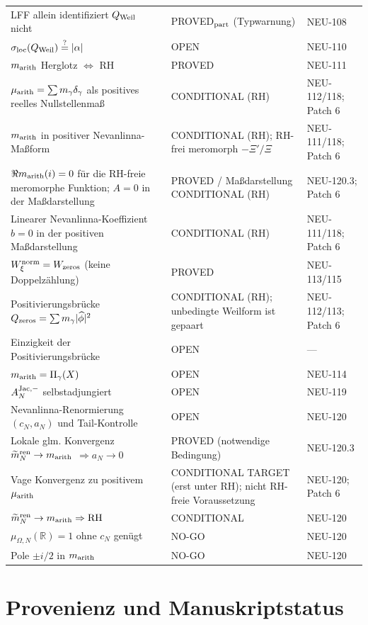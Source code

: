 \documentclass[11pt,a4paper]{amsart}
\newcommand{\RH}{\mathrm{RH}}
\begin{document}
\begin{longtable}{>{\raggedright\arraybackslash}p{}
                  >{\raggedright\arraybackslash}p{}
                  >{\raggedright\arraybackslash}p{}}
LFF allein identifiziert $Q_{\rm Weil}$ nicht
& PROVED$_{\rm part}$ (Typwarnung) & NEU-108\\
$\sigma_{\rm loc}(Q_{\rm Weil})\stackrel?=|\alpha|$
& OPEN & NEU-110\\
$m_{\rm arith}$ Herglotz $\Leftrightarrow$ RH
& PROVED & NEU-111\\
$\mu_{\rm arith}=\sum m_\gamma\delta_\gamma$ als positives reelles Nullstellenmaß
& CONDITIONAL (RH) & NEU-112/118; Patch 6\\
$m_{\rm arith}$ in positiver Nevanlinna-Maßform
& CONDITIONAL (RH); RH-frei meromorph $-\Xi'/\Xi$ & NEU-111/118; Patch 6\\
$\Re m_{\rm arith}(i)=0$ für die RH-freie meromorphe Funktion; $A=0$ in der Maßdarstellung
& PROVED / Maßdarstellung CONDITIONAL (RH) & NEU-120.3; Patch 6\\
Linearer Nevanlinna-Koeffizient $b=0$ in der positiven Maßdarstellung
& CONDITIONAL (RH) & NEU-111/118; Patch 6\\
$W_\xi^{\rm norm}=W_{\rm zeros}$ (keine Doppelzählung)
& PROVED & NEU-113/115\\
Positivierungsbrücke
$Q_{\rm zeros}=\sum m_\gamma|\widehat\phi|^2$
& CONDITIONAL (RH); unbedingte Weilform ist gepaart & NEU-112/113; Patch 6\\
Einzigkeit der Positivierungsbrücke
& OPEN & ---\\
$m_{\rm arith}=\Pi_\gamma(X)$
& OPEN & NEU-114\\
$A_N^{\rm Jac,-}$ selbstadjungiert
& OPEN & NEU-119\\
Nevanlinna-Renormierung $(c_N,a_N)$ und Tail-Kontrolle
& OPEN & NEU-120\\
Lokale glm. Konvergenz $\widetilde m_N^{\rm ren}\to m_{\rm arith}$
$\Rightarrow a_N\to0$
& PROVED (notwendige Bedingung) & NEU-120.3\\
Vage Konvergenz zu positivem $\mu_{\rm arith}$
& CONDITIONAL TARGET (erst unter RH); nicht RH-freie Voraussetzung & NEU-120; Patch 6\\
$\widetilde m_N^{\rm ren}\to m_{\rm arith}\Rightarrow\RH$
& CONDITIONAL & NEU-120\\
$\mu_{\Omega,N}(\mathbb R)=1$ ohne $c_N$ genügt
& NO-GO & NEU-120\\
Pole $\pm i/2$ in $m_{\rm arith}$
& NO-GO & NEU-120\\
\bottomrule
\end{longtable}
\normalsize

\section{Provenienz und Manuskriptstatus}
\end{document}
